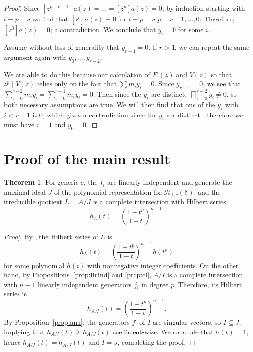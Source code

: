 \documentclass{amsart}
\numberwithin{equation}{section}
\theoremstyle{definition}
\newtheorem{theorem}{Theorem}[section]
\newcommand{\h}{\mathfrak{h}}
\newcommand{\HH}{\mathcal{H}}
\begin{document}
\begin{proof}
Since $[z^{p-r+1}]a(z)=\dots=[z^p]a(z)=0$, by induction starting with $l=p-r$ we find that $[z^l]a(z)=0$ for $l=p-r,p-r-1,\dots,0$. Therefore, $[z^0]a(z)=0$; a contradiction. We conclude that $y_i=0$ for some $i$.

Assume without loss of generality that $y_{r-1}=0$. If $r>1$, we can repeat the same argument again with $y_0,\dots,y_{r-2}$. 

We are able to do this because our calculation of $F'(z)$ and $V(z)$ so that $z^p \mid V(z)$ relies only on the fact that $\sum m_iy_i=0$. Since $y_{r-1}=0$, we see that $\sum_{i=0}^{r-2}m_iy_i=\sum_{i=0}^{r-1}m_iy_i=0$. Then since the $y_i$ are distinct, $\prod_{i=0}^{r-2} y_i \ne 0$, so both necessary assumptions are true. We will then find that one of the $y_i$ with $i < r-1$ is $0$, which gives a contradiction since the $y_i$ are distinct. Therefore we must have $r=1$ and $y_0=0$. 
\end{proof}

\section{Proof of the main result}

\begin{theorem}\label{thm:main}
For generic $c$, the $f_i$ are linearly independent and generate the maximal ideal $J$ of the polynomial representation for $\HH_{1, c}(\h)$, and the irreducible quotient $L = A/J$ is a complete intersection with Hilbert series 
\[
h_L(t) = \left(\frac{1-t^p}{1-t}\right)^{n-1}.
\]
\end{theorem}
\begin{proof}
By \cite[Proposition 3.4]{BC1}, the Hilbert series of $L$ is 
\[
h_L(t) = \left(\frac{1-t^p}{1-t}\right)^{n-1}h(t^p)
\]
for some polynomial $h(t)$ with nonnegative integer coefficients.  On the other hand, by Propositions~\ref{prop:linind} and \ref{prop:ci}, $A/I$ is a complete intersection with $n-1$ linearly independent generators $f_i$ in degree $p$.  Therefore, its Hilbert series is 
\[
h_{A/I}(t)=\left(\frac{1-t^p}{1-t}\right)^{n-1}.
\]
By Proposition~\ref{prop:ann}, the generators $f_i$ of $I$ are singular vectors, so $I \subseteq J$, implying that $h_{A/I}(t) \ge h_{A/J}(t)$ coefficient-wise.  We conclude that $h(t) = 1$, hence $h_{A/I}(t)=h_{A/J}(t)$ and $I=J$, completing the proof.
\end{proof}



\end{document}
